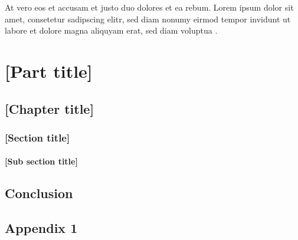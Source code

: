 \documentclass[12pt,a4paper]{book}
\begin{document}
At vero eos et accusam et justo duo dolores et ea rebum. Lorem ipsum dolor sit amet, consetetur sadipscing elitr, sed diam nonumy eirmod tempor invidunt ut labore et dolore magna aliquyam erat, sed diam voluptua \citep{hodgkin1952quantitative}.



\part{[Part title]}

\chapter{[Chapter title]}

\section{[Section title]}

\subsection{[Sub section title]}


\backmatter

\chapter{Conclusion}



\nocite{hubel1962receptive}
\appendix

\chapter{Appendix 1}



\printindex 
\end{document}

